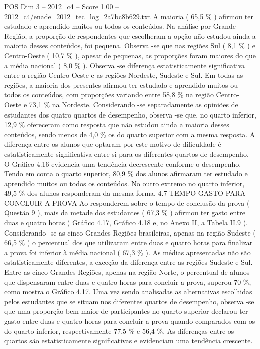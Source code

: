 \begin{textsample}{POS Dim 3 – 2012\_c4 – Score 1.00 – 2012\_c4/enade\_2012\_tec\_log\_2a7bc8b629.txt}
A maioria ( 65,5 \% ) afirmou ter estudado e aprendido muitos ou todos os conteúdos.
Na análise por Grande Região, a proporção de respondentes que escolheram a opção não estudou ainda a maioria desses conteúdos, foi pequena.
Observa -se que nas regiões Sul ( 8,1 \% ) e Centro-Oeste ( 10,7 \% ), apesar de pequenas, as proporções foram maiores do que a média nacional ( 8,0 \% ).
Observa -se diferença estatisticamente significativa entre a região Centro-Oeste e as regiões Nordeste, Sudeste e Sul.
Em todas as regiões, a maioria dos presentes afirmou ter estudado e aprendido muitos ou todos os conteúdos, com proporções variando entre 58,8 \% na região Centro-Oeste e 73,1 \% na Nordeste.
Considerando -se separadamente as opiniões de estudantes dos quatro quartos de desempenho, observa -se que, no quarto inferior, 12,9 \% ofereceram como resposta que não estudou ainda a maioria desses conteúdos, sendo menos de 4,0 \% os do quarto superior com a mesma resposta.
A diferença entre os alunos que optaram por este motivo de dificuldade é estatisticamente significativa entre si para os diferentes quartos de desempenho.
O Gráfico 4.16 evidencia uma tendência decrescente conforme o desempenho.
Tendo em conta o quarto superior, 80,9 \% dos alunos afirmaram ter estudado e aprendido muitos ou todos os conteúdos.
No outro extremo no quarto inferior, 49,5 \% dos alunos responderam da mesma forma. 4.7 TEMPO GASTO PARA CONCLUIR A PROVA Ao responderem sobre o tempo de conclusão da prova ( Questão 9 ), mais da metade dos estudantes ( 67,3 \% ) afirmou ter gasto entre duas e quatro horas ( Gráfico 4.17, Gráfico 4.18 e, no Anexo II, a Tabela II.9 ).
Considerando -se as cinco Grandes Regiões brasileiras, apenas na região Sudeste ( 66,5 \% ) o percentual dos que utilizaram entre duas e quatro horas para finalizar a prova foi inferior à média nacional ( 67,3 \% ).
As médias apresentadas não são estatisticamente diferentes, a exceção da diferença entre as regiões Sudeste e Sul.
Entre as cinco Grandes Regiões, apenas na região Norte, o percentual de alunos que dispensaram entre duas e quatro horas para concluir a prova, superou 70 \%, como mostra o Gráfico 4.17.
Uma vez sendo analisadas as alternativas escolhidas pelos estudantes que se situam nos diferentes quartos de desempenho, observa -se que uma proporção bem maior de participantes no quarto superior declarou ter gasto entre duas e quatro horas para concluir a prova quando comparados com os do quarto inferior, respectivamente 77,5 \% e 56,4 \%.
As diferenças entre os quartos são estatisticamente significativas e evidenciam uma tendência crescente.

\end{textsample}
